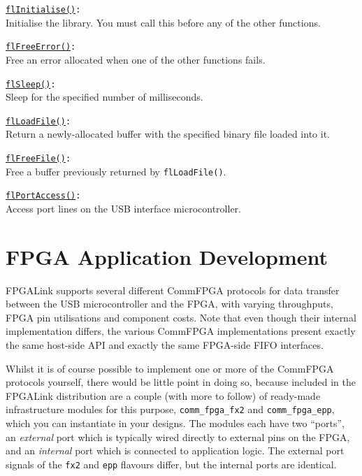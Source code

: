 \begin{desc}
  \item[\texttt{\href{http://www.swaton.ukfsn.org/apidocs/libfpgalink\_8h.html\#ac6b856aea9f2ed734835a33f8f5c6ea6}{flInitialise()}:}] \hfill \\
    Initialise the library. You must call this before any of the other functions.
  \item[\texttt{\href{http://www.swaton.ukfsn.org/apidocs/libfpgalink\_8h.html\#a313f24c559a56d12518cb1e7eacdf01b}{flFreeError()}:}] \hfill \\
    Free an error allocated when one of the other functions fails.
  \item[\texttt{\href{http://www.swaton.ukfsn.org/apidocs/libfpgalink\_8h.html\#a58a48f47195b55d4921659a74d9eed5d}{flSleep()}:}] \hfill \\
    Sleep for the specified number of milliseconds.
  \item[\texttt{\href{http://www.swaton.ukfsn.org/apidocs/libfpgalink\_8h.html\#ad2fd61ccae8632d5fa180d0c468257fb}{flLoadFile()}:}] \hfill \\
    Return a newly-allocated buffer with the specified binary file loaded into it.
  \item[\texttt{\href{http://www.swaton.ukfsn.org/apidocs/libfpgalink\_8h.html\#a17909597ec81d8610c791a1ebf5f1400}{flFreeFile()}:}] \hfill \\
    Free a buffer previously returned by \texttt{flLoadFile()}.
  \item[\texttt{\href{http://www.swaton.ukfsn.org/apidocs/libfpgalink\_8h.html\#a8bc413bef20060220fa864d0d77c25ea}{flPortAccess()}:}] \hfill \\
    Access port lines on the USB interface microcontroller.
\end{desc}

\newpage
\section{FPGA Application Development}
FPGALink supports several different CommFPGA protocols for data transfer between the USB microcontroller and the FPGA, with varying throughputs, FPGA pin utilisations and component costs. Note that even though their internal implementation differs, the various CommFPGA implementations present exactly the same host-side API and exactly the same FPGA-side FIFO interfaces.

Whilst it is of course possible to implement one or more of the CommFPGA protocols yourself, there would be little point in doing so, because included in the FPGALink distribution are a couple (with more to follow) of ready-made infrastructure modules for this purpose, \texttt{comm\_fpga\_fx2} and \texttt{comm\_fpga\_epp}, which you can instantiate in your designs. The modules each have two ``ports'', an \textit{external} port which is typically wired directly to external pins on the FPGA, and an \textit{internal} port which is connected to application logic. The external port signals of the \texttt{fx2} and \texttt{epp} flavours differ, but the internal ports are identical.

